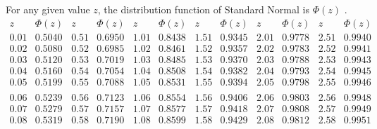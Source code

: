 
{\scriptsize{
For any given value $z$, the distribution function of Standard Normal is $\Phi(z)$ .%
$$
 \begin{array}{|c|c|c|c|c|c|c|c|c|c|c|c|}\hline
z       &       \Phi(z) &       z       &       \Phi(z) &       z       &       \Phi(z) &       z       &       \Phi(z) &       z       &       \Phi(z) &       z       &       \Phi(z) \\ \hline
0.01    &       0.5040  &       0.51    &       0.6950  &       1.01    &       0.8438  &       1.51    &       0.9345  &       2.01    &       0.9778  &       2.51    &       0.9940  \\
0.02    &       0.5080  &       0.52    &       0.6985  &       1.02    &       0.8461  &       1.52    &       0.9357  &       2.02    &       0.9783  &       2.52    &       0.9941  \\
0.03    &       0.5120  &       0.53    &       0.7019  &       1.03    &       0.8485  &       1.53    &       0.9370  &       2.03    &       0.9788  &       2.53    &       0.9943  \\
0.04    &       0.5160  &       0.54    &       0.7054  &       1.04    &       0.8508  &       1.54    &       0.9382  &       2.04    &       0.9793  &       2.54    &       0.9945  \\
0.05    &       0.5199  &       0.55    &       0.7088  &       1.05    &       0.8531  &       1.55    &       0.9394  &       2.05    &       0.9798  &       2.55    &       0.9946  \\
&&&&&&&&&&&\\
0.06    &       0.5239  &       0.56    &       0.7123  &       1.06    &       0.8554  &       1.56    &       0.9406  &       2.06    &       0.9803  &       2.56    &       0.9948  \\
0.07    &       0.5279  &       0.57    &       0.7157  &       1.07    &       0.8577  &       1.57    &       0.9418  &       2.07    &       0.9808  &       2.57    &       0.9949  \\
0.08    &       0.5319  &       0.58    &       0.7190  &       1.08    &       0.8599  &       1.58    &       0.9429  &       2.08    &       0.9812  &       2.58    &       0.9951  \\

\end{array}$$}}
